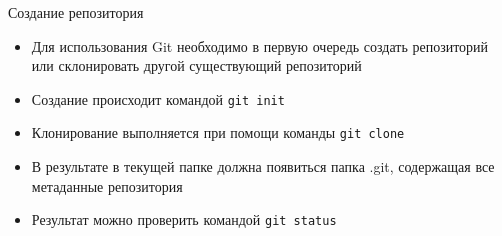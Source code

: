 \begin{frame}{Создание репозитория}
    \begin{itemize}
        \item
              Для использования Git необходимо в первую очередь создать репозиторий или склонировать другой существующий репозиторий
        \item
              Создание происходит командой \lstinline[style=BashInputStyle]{git init}
        \item
              Клонирование выполняется при помощи команды \lstinline[style=BashInputStyle]{git clone}
        \item
              В результате в текущей папке должна появиться папка .git, содержащая все метаданные репозитория
        \item
              Результат можно проверить командой \lstinline[style=BashInputStyle]{git status}
    \end{itemize}
\end{frame}